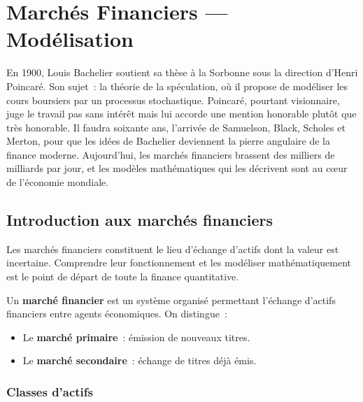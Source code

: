 \chapter{March\'es Financiers --- Mod\'elisation}
\label{ch:marches}

En 1900, Louis Bachelier soutient sa th\`ese \`a la Sorbonne sous la
direction d'Henri Poincar\'e. Son sujet~: la \og th\'eorie de la
sp\'eculation\fg, o\`u il propose de mod\'eliser les cours boursiers par un
processus stochastique. Poincar\'e, pourtant visionnaire, juge le travail
\og pas sans int\'er\^et\fg{} mais lui accorde une mention honorable plut\^ot
que tr\`es honorable. Il faudra soixante ans, l'arriv\'ee de Samuelson,
Black, Scholes et Merton, pour que les id\'ees de Bachelier deviennent la
pierre angulaire de la finance moderne. Aujourd'hui, les march\'es
financiers brassent des milliers de milliards par jour, et les mod\`eles
math\'ematiques qui les d\'ecrivent sont au c\oe ur de l'\'economie mondiale.

\section{Introduction aux march\'es financiers}

Les march\'es financiers constituent le lieu d'\'echange d'actifs dont la
valeur est incertaine. Comprendre leur fonctionnement et les mod\'eliser
math\'ematiquement est le point de d\'epart de toute la finance quantitative.

\begin{definition}
Un \textbf{march\'e financier} est un syst\`eme organis\'e permettant
l'\'echange d'actifs financiers entre agents \'economiques. On distingue~:
\begin{itemize}
    \item Le \textbf{march\'e primaire}~: \'emission de nouveaux titres.
    \item Le \textbf{march\'e secondaire}~: \'echange de titres d\'ej\`a \'emis.
\end{itemize}
\end{definition}

\subsection{Classes d'actifs}

